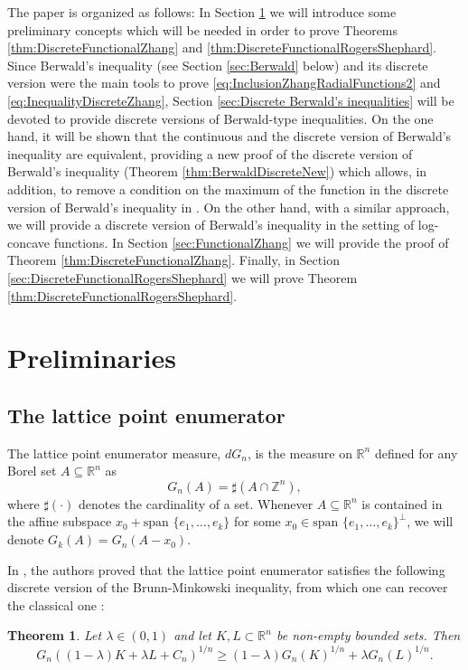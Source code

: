 \documentclass{amsart}
\newcommand{\R}{\mathbb R}
\newcommand{\Z}{\mathbb Z}
\newtheorem{thm}{Theorem}[section]
\theoremstyle{remark}
\theoremstyle{definition}
\numberwithin{equation}{section}
\begin{document}
The paper is organized as follows: In Section \ref{sec:Preliminaries} we will introduce some preliminary concepts which will be needed in order to prove Theorems \ref{thm:DiscreteFunctionalZhang} and \ref{thm:DiscreteFunctionalRogersShephard}. Since Berwald's inequality (see Section \ref{sec:Berwald} below) and its discrete version were the main tools to prove \eqref{eq:InclusionZhangRadialFunctions2} and \eqref{eq:InequalityDiscreteZhang}, Section \ref{sec:Discrete Berwald's inequalities} will be devoted to provide discrete versions of Berwald-type inequalities. On the one hand, it will be shown that the continuous and the discrete version of Berwald's inequality are equivalent, providing a new proof of the discrete version of Berwald's inequality (Theorem \ref{thm:BerwaldDiscreteNew}) which allows, in addition, to remove a condition on the maximum of the function in the discrete version of Berwald's inequality in \cite[Thm. 1.4]{ALY}. On the other hand, with a similar approach, we will provide a discrete version of Berwald's inequality in the setting of log-concave functions. In Section \ref{sec:FunctionalZhang} we will provide the proof of Theorem \ref{thm:DiscreteFunctionalZhang}. Finally, in Section \ref{sec:DiscreteFunctionalRogersShephard} we will prove Theorem \ref{thm:DiscreteFunctionalRogersShephard}.




\section{Preliminaries}\label{sec:Preliminaries}

\subsection{The lattice point enumerator}

The lattice point enumerator measure, $dG_n$, is the measure on $\R^n$ defined for any Borel set $A \subseteq \R^n$ as
\[
G_n(A)=\sharp(A\cap\Z^n),
\]
where $\sharp (\cdot)$ denotes the cardinality of a set. Whenever $A \subseteq \R^n$ is contained in the affine subspace $x_0+\text{span } \{e_1, \ldots, e_k \}$ for some $x_0 \in \text{span } \{e_1, \ldots, e_k \}^{\perp}$, we will denote $G_k(A)=G_n(A-x_0)$.

In \cite[Thm. 2.1]{IYNZ}, the authors proved that the lattice point enumerator satisfies the following discrete version of the Brunn-Minkowski inequality, from which one can recover the classical one \cite[Thm. 7.1.1]{Sch}:
\begin{thm}\label{thm: BM_lattice_point_no_G(K)G(L)>0}
Let $\lambda\in(0,1)$ and let $K,L\subset\R^n$ be non-empty bounded sets. Then
$$
G_n\left((1-\lambda)K+\lambda L+C_n\right)^{1/n}\geq(1-\lambda)G_n(K)^{1/n}+\lambda G_n(L)^{1/n}.
$$
\end{thm}
\end{document}

